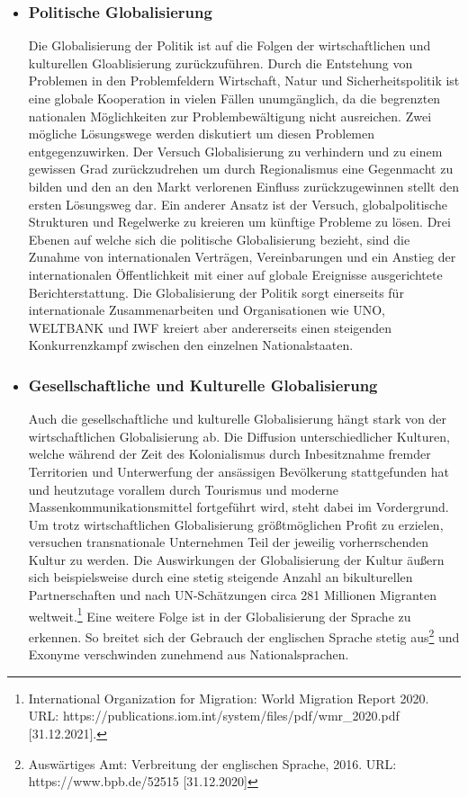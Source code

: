 \documentclass[12pt]{article}
\begin{document}
\begin{itemize}
    \item \subsubsection{Politische Globalisierung}
    Die Globalisierung der Politik ist auf die Folgen der wirtschaftlichen und kulturellen Gloablisierung zurückzuführen. Durch die Entstehung von Problemen in den Problemfeldern Wirtschaft, Natur und Sicherheitspolitik ist eine globale Kooperation in vielen Fällen unumgänglich, da die begrenzten nationalen Möglichkeiten zur Problembewältigung nicht ausreichen. Zwei mögliche Lösungswege werden diskutiert um diesen Problemen entgegenzuwirken. Der Versuch Globalisierung zu verhindern und zu einem gewissen Grad zurückzudrehen um durch Regionalismus eine Gegenmacht zu bilden und den an den Markt verlorenen Einfluss zurückzugewinnen stellt den ersten Lösungsweg dar. Ein anderer Ansatz ist der Versuch, globalpolitische Strukturen und Regelwerke zu kreieren um künftige Probleme zu lösen. Drei Ebenen auf welche sich die politische Globalisierung bezieht, sind die Zunahme von internationalen Verträgen, Vereinbarungen und ein Anstieg der internationalen Öffentlichkeit mit einer auf globale Ereignisse ausgerichtete Berichterstattung. Die Globalisierung der Politik sorgt einerseits für internationale Zusammenarbeiten und Organisationen wie UNO, WELTBANK und IWF kreiert aber andererseits einen steigenden Konkurrenzkampf zwischen den einzelnen Nationalstaaten.
    \item \subsubsection{Gesellschaftliche und Kulturelle Globalisierung}
    Auch die gesellschaftliche und kulturelle Globalisierung hängt stark von der wirtschaftlichen Globalisierung ab. Die Diffusion unterschiedlicher Kulturen, welche während der Zeit des Kolonialismus durch Inbesitznahme fremder Territorien und Unterwerfung der ansässigen Bevölkerung stattgefunden hat und heutzutage vorallem durch Tourismus und moderne Massenkommunikationsmittel fortgeführt wird, steht dabei im Vordergrund. Um trotz wirtschaftlichen Globalisierung größtmöglichen Profit zu erzielen, versuchen transnationale Unternehmen Teil der jeweilig vorherrschenden Kultur zu werden. Die Auswirkungen der Globalisierung der Kultur äußern sich beispielsweise durch eine stetig steigende Anzahl an bikulturellen Partnerschaften und nach UN-Schätzungen circa 281 Millionen Migranten weltweit.\footnote{International Organization for Migration: World Migration Report 2020. URL: https://publications.iom.int/system/files/pdf/wmr_2020.pdf [31.12.2021].} Eine weitere Folge ist in der Globalisierung der Sprache zu erkennen. So breitet sich der Gebrauch der englischen Sprache stetig aus\footnote{Auswärtiges Amt: Verbreitung der englischen Sprache, 2016. URL: https://www.bpb.de/52515 [31.12.2020]} und Exonyme verschwinden zunehmend aus Nationalsprachen.

\end{itemize}
\end{document}
